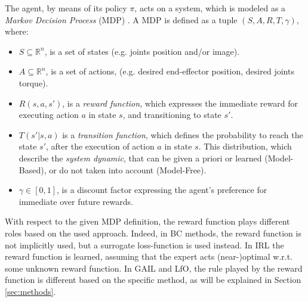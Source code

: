 \newline The agent, by means of its policy $\pi$, acts on a system, which is modeled as a \textit{Markov Decision Process} (MDP) \cite{kroemer2021review_robot_learning}. A MDP is defined as a tuple $(S,A,R,T,\gamma)$, where:
\begin{itemize}
    \item $S \subseteq \mathbb{R}^{n}$, is a set of states (e.g. joints position and/or image).
    \item $A \subseteq \mathbb{R}^{n}$, is a set of actions, (e.g. desired end-effector position, desired joints torque).
    \item $R(s,a,s')$, is a \textit{reward function}, which expresses the immediate reward for executing action $a$ in state $s$, and transitioning to state $s'$.
    \item $T(s'|s,a)$ is a \textit{transition function}, which defines the probability to reach the state $s'$, after the execution of action $a$ in state $s$. This distribution, which describe the \textit{system dynamic}, that can be given a priori or learned (Model-Based), or do not taken into account (Model-Free).
    \item $\gamma \in [0,1]$, is a discount factor expressing the agent's preference for immediate over future rewards.
\end{itemize}
With respect to the given MDP definition, the reward function plays different roles based on the used approach. Indeed, in BC methods, the reward function is not implicitly used, but a surrogate loss-function is used instead. In IRL the reward function is learned, assuming that the expert acts (near-)optimal w.r.t. some unknown reward function. In GAIL and LfO, the rule played by the reward function is different based on the specific method, as will be explained in Section \ref{sec:methods}.